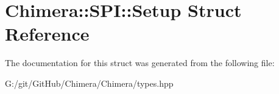 \hypertarget{struct_chimera_1_1_s_p_i_1_1_setup}{}\section{Chimera\+:\+:S\+PI\+:\+:Setup Struct Reference}
\label{struct_chimera_1_1_s_p_i_1_1_setup}


The documentation for this struct was generated from the following file\+:\begin{DoxyCompactItemize}
\item 
G\+:/git/\+Git\+Hub/\+Chimera/\+Chimera/types.\+hpp\end{DoxyCompactItemize}
